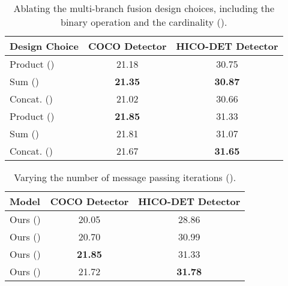 \documentclass[10pt,twocolumn,letterpaper]{article}
\begin{document}
\begin{table}[t]\small
   \caption{Ablating the multi-branch fusion design choices, including the binary operation and the cardinality ().}
   \label{tab:cardinality}
\setlength{\tabcolsep}{4pt} \begin{tabularx}{\linewidth}{l C c}
		\toprule
      \textbf{Design Choice} & \textbf{COCO Detector} & \textbf{HICO-DET Detector} \\
      \midrule
		Product () & 21.18 & 30.75 \\
      Sum () & \textbf{21.35} & \textbf{30.87} \\
      Concat. () & 21.02 & 30.66 \\
      \midrule
		Product () & \textbf{21.85} & 31.33 \\
      Sum () & 21.81 & 31.07 \\
      Concat. () & 21.67 & \textbf{31.65} \\
		\bottomrule
	\end{tabularx}
\end{table}



\begin{table}[t]\small
   \caption{Varying the number of message passing iterations ().}
   \label{tab:iterations}
\setlength{\tabcolsep}{4pt} \begin{tabularx}{\linewidth}{l C c}
		\toprule
      \textbf{Model} & \textbf{COCO Detector} & \textbf{HICO-DET Detector} \\
      \midrule
		Ours () & 20.05 & 28.86 \\
		Ours () & 20.70 & 30.99 \\
		Ours () & \textbf{21.85} & 31.33 \\
		Ours () & 21.72 & \textbf{31.78} \\
		\bottomrule
	\end{tabularx}
\end{table}
\end{document}
